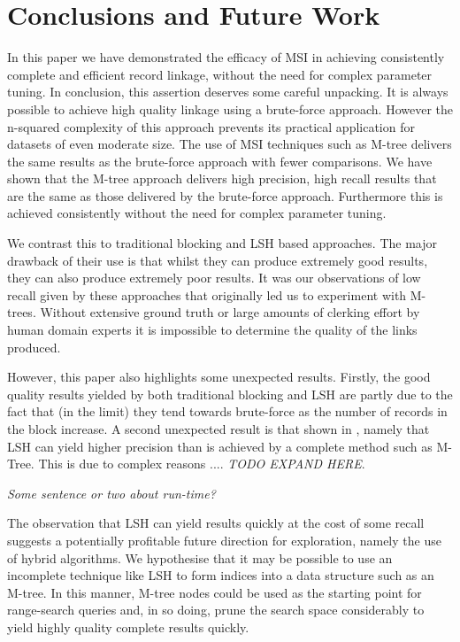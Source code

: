 \documentclass{llncs}
\begin{document}

\section{Conclusions and Future Work\label{sec-concl}}

In this paper we have demonstrated the efficacy of MSI in achieving consistently complete and efficient record linkage, without the need for complex parameter tuning. In conclusion, this assertion deserves some careful unpacking. It is always possible to achieve high quality linkage using a brute-force approach. However the n-squared complexity of this approach prevents its practical application for datasets of even moderate size. The use of MSI techniques such as M-tree delivers the same results as the brute-force approach with fewer comparisons. We have shown that the M-tree approach delivers high precision, high recall results that are the same as those delivered by the brute-force approach. Furthermore this is achieved consistently without the need for complex parameter tuning.

We contrast this to traditional blocking and LSH based approaches. The major drawback of their use is that whilst they can produce extremely good results, they can also produce extremely poor results. It was our observations of low recall given by these approaches that originally led us to experiment with M-trees. Without extensive ground truth or large amounts of clerking effort by human domain experts it is impossible to determine the quality of the links produced. 

However, this paper also highlights some unexpected results. Firstly, the good quality results yielded by both traditional blocking and LSH are partly due to the fact that (in the limit) they tend towards brute-force as the number of records in the block increase. A second unexpected result is that shown in , namely that LSH can yield higher precision than is achieved by a complete method such as M-Tree. This is due to complex reasons .... \emph{TODO EXPAND HERE}.

\emph{Some sentence or two about run-time?}

The observation that LSH can yield results quickly at the cost of some recall suggests a potentially profitable future direction for exploration, namely the use of hybrid algorithms. We hypothesise that it may be possible to use an incomplete technique like LSH to form indices into a data structure such as an M-tree. In this manner, M-tree nodes could be used as the starting point for range-search queries and, in so doing, prune the search space considerably to yield highly quality complete results quickly.




 

\end{document}
